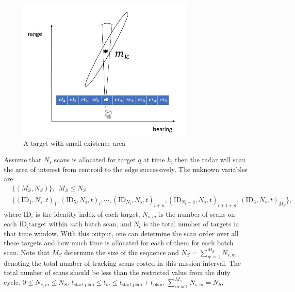 \documentclass[12pt,journal,draftclsnofoot,onecolumn]{IEEEtran}
\begin{document}
\begin{figure}
	\centering
	\includegraphics[width=3.5in]{Linear Wipe Fails.jpg}
	\caption{A target with small existence area}
	\label{fig:linearwipefails}
\end{figure}

Assume that $N_s$ scans is allocated for target $q$ at time $k$, then the radar will scan the area of interest from centroid to the edge successively. The unknown variables are 
\begin{equation}
	\begin{aligned}
		&\{(M_S, N_S)\},~~M_S\le N_S\\
		&\{(\text{ID}_1,N_s,t)_1,(\text{ID}_5,N_s,t)_i,\cdots,(\text{ID}_{N_t},N_s,t)_{i+n},(\text{ID}_{N_t-4},N_s,t)_{i+1+n},(\text{ID}_3,N_s,t)_{M_S}\},
	\end{aligned}
\end{equation}
where $\text{ID}_i$ is the identity index of each target, $N_{s,m}$ is the number of scans on each $\text{ID}_i$target within $m$th batch scan, and $N_t$ is the total number of targets in that time window. With this output, one can determine the scan order over all these targets and how much time is allocated for each of them for each batch scan. Note that $M_S$ determine the size of the sequence and $N_S = \sum_{m=1}^{M_S}N_{s,m}$ denoting the total number of tracking scans costed in this mission interval. The total number of scans should be less than the restricted value from the duty cycle. $0\le N_{s,m}\le N_S$, $t_{\text{start,plan}}\le t_m\le t_{\text{start,plan}}+t_{\text{plan}}$. $\sum_{m=1}^{M_S}N_{s,m} = N_S$.
\end{document}
